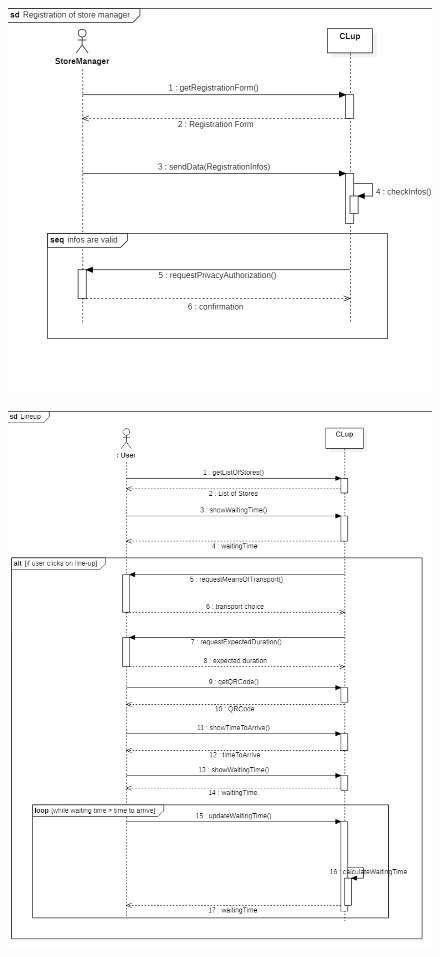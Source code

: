 \documentclass{article}
\begin{document}
\begin{figure}[H]
  \includegraphics[width=\linewidth]{RegistrationSequence.png}
  
\end{figure}

\begin{figure}[H]
  \includegraphics[width=\linewidth]{LineUpSequence.png}
  
\end{figure}
\end{document}
